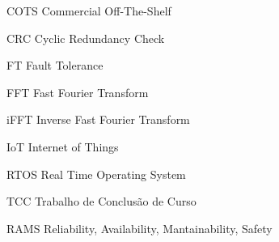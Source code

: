 \listoffigures*
\cleardoublepage


\listofquadros*
\cleardoublepage

\begin{siglas}
    \item[COTS] Commercial Off-The-Shelf
    \item[CRC]  Cyclic Redundancy Check
    \item[FT]   Fault Tolerance
    \item[FFT]  Fast Fourier Transform
    \item[iFFT] Inverse Fast Fourier Transform
    \item[IoT]  Internet of Things
    \item[RTOS] Real Time Operating System
    \item[TCC]  Trabalho de Conclusão de Curso
    \item[RAMS] Reliability, Availability, Mantainability, Safety
\end{siglas}


\tableofcontents*
\cleardoublepage
